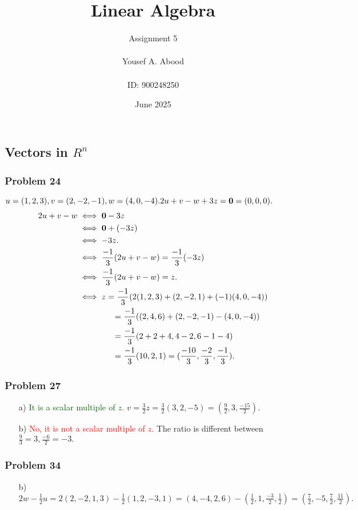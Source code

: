 \documentclass[a4paper,12pt]{article}
\title{Linear Algebra}
\author{Assignment 5\\ \\ Yousef A. Abood\\ \\ ID: 900248250}
\date{June 2025}
\begin{document}
\maketitle
\noindent\makebox[\linewidth]{\rule{15cm}{0.4pt}}
\subsection{Vectors in $R^n$}
\subsubsection*{Problem 24}
$u=(1, 2, 3), v=(2, -2, -1), w=(4, 0, -4).\\
2u+v-w+3z=\textbf{0}
     =(0, 0, 0).$
\begin{align*}
2u+v-w &\iff \textbf{0}-3z\\
       &\iff \textbf{0}+(-3z)\\
       &\iff -3z.\\
&\iff \frac{-1}{3}(2u+v-w)=\frac{-1}{3}(-3z)\\
&\iff \frac{-1}{3}(2u+v-w)=z.\\
&\iff z=\frac{-1}{3}(2(1,2,3)+(2,-2,1)+(-1)(4,0,-4)) \\
&\hspace{1.5cm}= \frac{-1}{3}((2,4,6)+(2,-2,-1)-(4,0,-4))\\
&\hspace{1.5cm}=\frac{-1}{3}(2+2+4,4-2,6-1-4)\\
&\hspace{1.5cm}=\frac{-1}{3}(10,2,1)=(\frac{-10}{3},\frac{-2}{3},\frac{-1}{3}).
\end{align*}
\subsubsection*{Problem 27}
\begin{itemize}
    \item [a)] \textcolor{darkgreen}{It is a scalar multiple of $z$.} $v=\frac{3}{2}z=\frac{3}{2}(3,2,-5)=(\frac{9}{2},3,\frac{-15}{2}).$
    \item [b)] \textcolor{red}{No, it is not a scalar multiple of $z$.} The ratio is different between $\frac{9}{3}=3, \frac{-6}{2}=-3.$
\end{itemize}
\subsubsection*{Problem 34}
\begin{itemize}
    \item [b)] $2w-\frac{1}{2}u=2(2,-2,1,3)-\frac{1}{2}(1,2,-3,1) = (4,-4,2,6)-(\frac{1}{2},1,\frac{-3}{2},\frac{1}{2})=(\frac{7}{2},-5,\frac{7}{2},\frac{11}{2}).$
\end{itemize}
\end{document}
